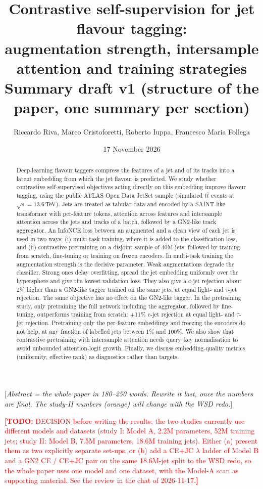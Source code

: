 \documentclass[11pt,a4paper]{article}
\title{Contrastive self-supervision for jet flavour tagging:\\
augmentation strength, intersample attention and training strategies\\[4pt]
\large Summary draft v1 (structure of the paper, one summary per section)}
\author{Riccardo Riva, Marco Cristoforetti, Roberto Iuppa, Francesco Maria Follega
\todo{confirm author list, order and affiliations (FBK, Univ.\ Trento, TIFPA?)}}
\date{17 November 2026}
\newcommand{\todo}[1]{\textcolor{red}{\textbf{[TODO:} #1\textbf{]}}}
\newcommand{\note}[1]{\textcolor{blue!70!black}{[\emph{#1}]}}
\newcommand{\prov}[1]{\textcolor{orange!85!black}{#1}}
\newcommand{\ttbar}{\ensuremath{t\bar{t}}}
\begin{document}
\maketitle

\begin{abstract}
Deep-learning flavour taggers compress the features of a jet and of its tracks into a
latent embedding from which the jet flavour is predicted. We study whether contrastive
self-supervised objectives acting directly on this embedding improve flavour tagging,
using the public ATLAS Open Data JetSet sample (simulated \ttbar{} events at
$\sqrt{s}=13.6$\,TeV). Jets are treated as tabular data and encoded by a SAINT-like
transformer with per-feature tokens, attention across features and intersample attention
across the jets and tracks of a batch, followed by a GN2-like track aggregator. An InfoNCE
loss between an augmented and a clean view of each jet is used in two ways:
(i) multi-task training, where it is added to the classification loss, and
(ii) contrastive pretraining on a disjoint sample of 40M jets, followed by training from
scratch, fine-tuning or training on frozen encoders. In multi-task training the augmentation
strength is the decisive parameter. Weak augmentations degrade the classifier. Strong ones
delay overfitting, spread the jet embedding uniformly over the hypersphere and give the
lowest validation loss. They also give a c-jet rejection about 2\% higher than a GN2-like
tagger trained on the same jets, at equal light- and $\tau$-jet rejection. The same objective
has no effect on the GN2-like tagger. In the pretraining study, only pretraining the full
network including the aggregator, followed by fine-tuning, outperforms training from scratch:
\prov{+11\%} c-jet rejection at equal light- and $\tau$-jet rejection. Pretraining only the
per-feature embeddings and freezing the encoders do not help, at any fraction of labelled
jets between 1\% and 100\%. We also show that contrastive pretraining with intersample
attention needs query--key normalisation to avoid unbounded attention-logit growth. Finally,
we discuss embedding-quality metrics (uniformity, effective rank) as diagnostics rather than
targets.
\end{abstract}

\noindent\note{Abstract = the whole paper in 180--250 words. Rewrite it last, once the
numbers are final. The study-II numbers (orange) will change with the WSD redo.}

\medskip
\noindent\todo{DECISION before writing the results: the two studies currently use different
models and datasets (study I: Model A, 2.2M parameters, 52M training jets; study II: Model B,
7.5M parameters, 18.6M training jets). Either (a) present them as two explicitly separate
set-ups, or (b) add a CE+JC $\lambda$ ladder of Model B and a GN2 CE / CE+JC pair on the
same 18.6M-jet split to the WSD redo, so the whole paper uses one model and one dataset,
with the Model-A scan as supporting material. See the review in the chat of 2026-11-17.}
\end{document}
